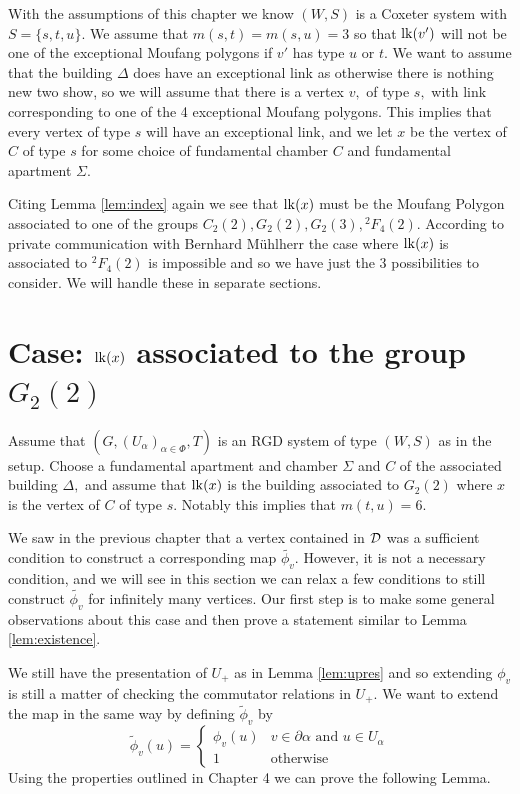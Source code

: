 \documentclass[class=book, crop=false]{standalone}
\begin{document}
With the assumptions of this chapter we know $(W,S)$ is a Coxeter system with $S=\{s,t,u\}.$ We assume that $m(s,t)=m(s,u)=3$ so that $\mathrm{lk}(v')$ will not be one of the exceptional Moufang polygons if $v'$ has type $u$ or $t.$ We want to assume that the building $\Delta$ does have an exceptional link as otherwise there is nothing new two show, so we will assume that there is a vertex $v,$ of type $s,$ with link corresponding to one of the 4 exceptional Moufang polygons. This implies that every vertex of type $s$ will have an exceptional link, and we let $x$ be the vertex of $C$ of type $s$ for some choice of fundamental chamber $C$ and fundamental apartment $\Sigma.$

Citing Lemma \ref{lem:index} again we see that $\mathrm{lk}(x)$ must be the Moufang Polygon associated to one of the groups $C_2(2),G_2(2),G_2(3),{}^2F_4(2).$ According to private communication with Bernhard M\"{u}hlherr the case where $\mathrm{lk}(x)$ is associated to ${}^2F_4(2)$ is impossible and so we have just the 3 possibilities to consider. We will handle these in separate sections.

\section{Case: $\mathrm{lk}(x)$ associated to the group $G_2(2)$}
Assume that $(G,(U_\alpha)_{\alpha\in \Phi},T)$ is an RGD system of type $(W,S)$ as in the setup. Choose a fundamental apartment and chamber $\Sigma$ and $C$ of the associated building $\Delta,$ and assume that $\mathrm{lk}(x)$ is the building associated to $G_2(2)$ where $x$ is the vertex of $C$ of type $s.$ Notably this implies that $m(t,u)=6.$

We saw in the previous chapter that a vertex contained in $\mathcal{D}$ was a sufficient condition to construct a corresponding map $\tilde{\phi_v}.$ However, it is not a necessary condition, and we will see in this section we can relax a few conditions to still construct $\tilde{\phi_v}$ for infinitely many vertices. Our first step is to make some general observations about this case and then prove a statement similar to Lemma \ref{lem:existence}.

We still have the presentation of $U_+$ as in Lemma \ref{lem:upres} and so extending $\phi_v$ is still a matter of checking the commutator relations in $U_+.$ We want to extend the map in the same way by defining $\tilde{\phi}_v$ by
\[
	\tilde{\phi}_v(u)=\begin{cases}\phi_v(u)&v\in \partial\alpha\text{ and }u\in U_\alpha\\
	1&\text{otherwise}\end{cases}
\]
Using the properties outlined in Chapter 4 we can prove the following Lemma.
\end{document}
